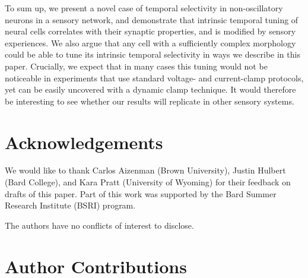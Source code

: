 \documentclass{article}
\begin{document}

To sum up, we present a novel case of temporal selectivity in non-oscillatory neurons in a sensory network, and demonstrate that intrinsic temporal tuning of neural cells correlates with their synaptic properties, and is modified by sensory experiences. We also argue that any cell with a sufficiently complex morphology could be able to tune its intrinsic temporal selectivity in ways we describe in this paper. Crucially, we expect that in many cases this tuning would not be noticeable in experiments that use standard voltage- and current-clamp protocols, yet can be easily uncovered with a dynamic clamp technique. It would therefore be interesting to see whether our results will replicate in other sensory systems.


\section*{Acknowledgements}

We would like to thank Carlos Aizenman (Brown University), Justin Hulbert (Bard College), and Kara Pratt (University of Wyoming) for their feedback on drafts of this paper. Part of this work was supported by the Bard Summer Research Institute (BSRI) program.


The authors have no conflicts of interest to disclose.

\section*{Author Contributions}
\end{document}

